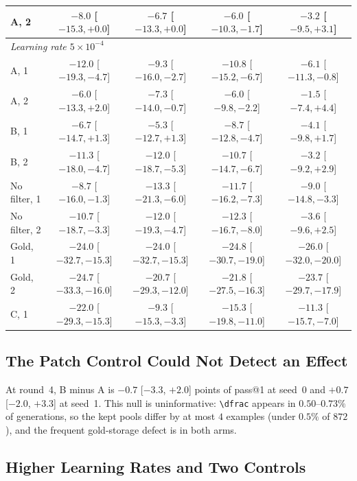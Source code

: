 \documentclass[runningheads]{llncs}
\begin{document}
\begin{table}[!htb]
\begin{tabular}{lcccc}
A, 2 & $-8.0$ [$-15.3,+0.0$] & $-6.7$ [$-13.3,+0.0$] & $-6.0$ [$-10.3,-1.7$] & $-3.2$ [$-9.5,+3.1$] \\
\midrule
\multicolumn{5}{l}{\emph{Learning rate $5\!\times\!10^{-4}$}} \\
A, 1 & $-12.0$ [$-19.3,-4.7$] & $-9.3$ [$-16.0,-2.7$] & $-10.8$ [$-15.2,-6.7$] & $-6.1$ [$-11.3,-0.8$] \\
A, 2 & $-6.0$ [$-13.3,+2.0$] & $-7.3$ [$-14.0,-0.7$] & $-6.0$ [$-9.8,-2.2$] & $-1.5$ [$-7.4,+4.4$] \\
B, 1 & $-6.7$ [$-14.7,+1.3$] & $-5.3$ [$-12.7,+1.3$] & $-8.7$ [$-12.8,-4.7$] & $-4.1$ [$-9.8,+1.7$] \\
B, 2 & $-11.3$ [$-18.0,-4.7$] & $-12.0$ [$-18.7,-5.3$] & $-10.7$ [$-14.7,-6.7$] & $-3.2$ [$-9.2,+2.9$] \\
No filter, 1 & $-8.7$ [$-16.0,-1.3$] & $-13.3$ [$-21.3,-6.0$] & $-11.7$ [$-16.2,-7.3$] & $-9.0$ [$-14.8,-3.3$] \\
No filter, 2 & $-10.7$ [$-18.7,-3.3$] & $-12.0$ [$-19.3,-4.7$] & $-12.3$ [$-16.7,-8.0$] & $-3.6$ [$-9.6,+2.5$] \\
Gold, 1 & $-24.0$ [$-32.7,-15.3$] & $-24.0$ [$-32.7,-15.3$] & $-24.8$ [$-30.7,-19.0$] & $-26.0$ [$-32.0,-20.0$] \\
Gold, 2 & $-24.7$ [$-33.3,-16.0$] & $-20.7$ [$-29.3,-12.0$] & $-21.8$ [$-27.5,-16.3$] & $-23.7$ [$-29.7,-17.9$] \\
C, 1 & $-22.0$ [$-29.3,-15.3$] & $-9.3$ [$-15.3,-3.3$] & $-15.3$ [$-19.8,-11.0$] & $-11.3$ [$-15.7,-7.0$] \\
\bottomrule
\end{tabular}
\end{table}

\subsection{The Patch Control Could Not Detect an Effect}
\label{sec:control}
\label{sec:prevalence}
\label{sec:answer-diversity}

At round~4, B minus A is $-0.7$ [$-3.3$, $+2.0$] points of pass@1 at seed~0 and
$+0.7$ [$-2.0$, $+3.3$] at seed~1. This null is uninformative: \verb|\dfrac|
appears in $0.50$--$0.73\%$ of generations, so the kept pools differ by at most
$4$ examples (under $0.5\%$ of $872$), and the frequent gold-storage defect is in
both arms.

\subsection{Higher Learning Rates and Two Controls}
\label{sec:lrcheck}
\end{document}
